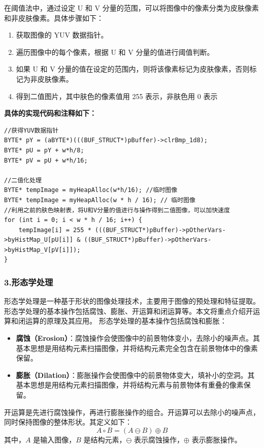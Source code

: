 \documentclass[12pt,hyperref,a4paper,UTF8]{ctexart}
\begin{document}
        在阈值法中，通过设定 U 和 V 分量的范围，可以将图像中的像素分类为皮肤像素和非皮肤像素。具体步骤如下：

        \begin{enumerate}
            \item 获取图像的 YUV 数据指针。
            \item 遍历图像中的每个像素，根据 U 和 V 分量的值进行阈值判断。
            \item 如果 U 和 V 分量的值在设定的范围内，则将该像素标记为皮肤像素，否则标记为非皮肤像素。
            \item 得到二值图片，其中肤色的像素值用 255 表示，非肤色用 0 表示
        \end{enumerate}


        \textbf{具体的实现代码和注释如下：}
        \begin{lstlisting}[caption={肤色建模}, label={lst:example}]
//获得YUV数据指针
BYTE* pY = (aBYTE*)(((BUF_STRUCT*)pBuffer)->clrBmp_1d8);
BYTE* pU = pY + w*h/8;
BYTE* pV = pU + w*h/16;

//二值化处理
BYTE* tempImage = myHeapAlloc(w*h/16); //临时图像
BYTE* tempImage = myHeapAlloc(w * h / 16); // 临时图像
//利用之前的肤色映射表，将U和V分量的值进行与操作得到二值图像，可以加快速度
for (int i = 0; i < w * h / 16; i++) {
    tempImage[i] = 255 * (((BUF_STRUCT*)pBuffer)->pOtherVars->byHistMap_U[pU[i]] & ((BUF_STRUCT*)pBuffer)->pOtherVars->byHistMap_V[pV[i]]);
}
        \end{lstlisting}

        \subsubsection*{\large \textbf{3.形态学处理}}

形态学处理是一种基于形状的图像处理技术，主要用于图像的预处理和特征提取。形态学处理的基本操作包括腐蚀、膨胀、开运算和闭运算等。本文将重点介绍开运算和闭运算的原理及其应用。
形态学处理的基本操作包括腐蚀和膨胀：
\begin{itemize}
    \item \textbf{腐蚀（Erosion）}：腐蚀操作会使图像中的前景物体变小，去除小的噪声点。其基本思想是用结构元素扫描图像，并将结构元素完全包含在前景物体中的像素保留。
    \item \textbf{膨胀（Dilation）}：膨胀操作会使图像中的前景物体变大，填补小的空洞。其基本思想是用结构元素扫描图像，并将结构元素与前景物体有重叠的像素保留。
\end{itemize}

开运算是先进行腐蚀操作，再进行膨胀操作的组合。开运算可以去除小的噪声点，同时保持图像的整体形状。其定义如下：
\[
A \circ B = (A \ominus B) \oplus B
\]
其中，$A$ 是输入图像，$B$ 是结构元素，$\ominus$ 表示腐蚀操作，$\oplus$ 表示膨胀操作。
\end{document}
